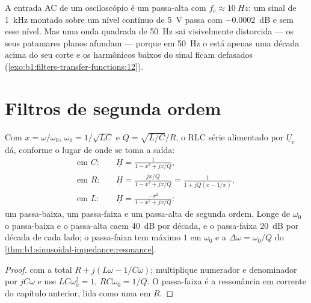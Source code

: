 \begin{example}[Acoplamento AC]\label{ex:b1:filters-transfer-functions:accoupling}
A entrada AC de um osciloscópio é um passa-alta com $f_c \approx \qty{10}{Hz}$:
um sinal de \qty{1}{kHz} montado sobre um nível contínuo de \qty{5}{V} passa com
\qty{-0.0002}{dB} e sem esse nível. Mas uma onda quadrada de \qty{50}{Hz}
sai visivelmente distorcida --- os seus patamares planos afundam --- porque em
\qty{50}{Hz} o  está apenas uma década acima do seu corte e os
harmônicos baixos do sinal ficam defasados
(\cref{exo:b1:filters-transfer-functions:12}).
\end{example}

\section{Filtros de segunda ordem}

\begin{proposition}\label{prop:b1:filters-transfer-functions:rlc}
Com $x = \omega/\omega_0$, $\omega_0 = 1/\sqrt{LC}$ e $Q =
\sqrt{L/C}/R$, o RLC série alimentado por $\underline U_e$ dá, conforme
o lugar de onde se toma a saída:
\begin{align*}
\text{em } C:&\quad \underline H = \frac{1}{1 - x^2 + jx/Q}, \\
\text{em } R:&\quad \underline H = \frac{jx/Q}{1 - x^2 + jx/Q} = \frac{1}{1 + jQ(x - 1/x)}, \\
\text{em } L:&\quad \underline H = \frac{-x^2}{1 - x^2 + jx/Q}:
\end{align*}
um passa-baixa, um passa-faixa e um passa-alta de segunda ordem. Longe de
$\omega_0$ o passa-baixa e o passa-alta caem \qty{40}{dB} por década, e
o passa-faixa \qty{20}{dB} por década de cada lado; o passa-faixa
tem máximo $1$ em $\omega_0$ e a  $\Delta\omega =
\omega_0/Q$ do \cref{thm:b1:sinusoidal-impedance:resonance}.
\end{proposition}

\begin{proof}
 com a  total $R + j(L\omega - 1/C\omega)$;
multiplique numerador e denominador por $jC\omega$ e use
$LC\omega_0^2 = 1$, $RC\omega_0 = 1/Q$. O passa-faixa é a ressonância
em corrente do capítulo anterior, lida como uma  em $R$.
\end{proof}

